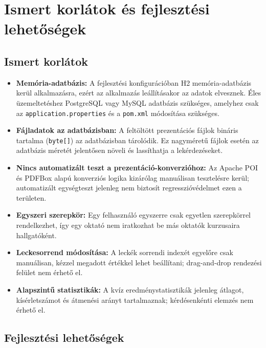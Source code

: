 \section{Ismert korlátok és fejlesztési lehetőségek}

\subsection{Ismert korlátok}

\begin{itemize}
    \item \textbf{Memória-adatbázis:} A fejlesztési konfigurációban H2 memória-adatbázis kerül alkalmazásra, ezért az alkalmazás leállításakor az adatok elvesznek. Éles üzemeltetéshez PostgreSQL vagy MySQL adatbázis szükséges, amelyhez csak az \texttt{application.properties} és a \texttt{pom.xml} módosítása szükséges.
    \item \textbf{Fájladatok az adatbázisban:} A feltöltött prezentációs fájlok bináris tartalma (\texttt{byte[]}) az adatbázisban tárolódik. Ez nagyméretű fájlok esetén az adatbázis méretét jelentősen növeli és lassíthatja a lekérdezéseket.
    \item \textbf{Nincs automatizált teszt a prezentáció-konverzióhoz:} Az Apache POI és PDFBox alapú konverziós logika kizárólag manuálisan tesztelésre kerül; automatizált egységteszt jelenleg nem biztosít regresszióvédelmet ezen a területen.
    \item \textbf{Egyszeri szerepkör:} Egy felhasználó egyszerre csak egyetlen szerepkörrel rendelkezhet, így egy oktató nem iratkozhat be más oktatók kurzusaira hallgatóként.
    \item \textbf{Leckesorrend módosítása:} A leckék sorrendi indexét egyelőre csak manuálisan, kézzel megadott értékkel lehet beállítani; drag-and-drop rendezési felület nem érhető el.
    \item \textbf{Alapszintű statisztikák:} A kvíz eredménystatisztikák jelenleg átlagot, kísérletszámot és átmenési arányt tartalmaznak; kérdésenkénti elemzés nem érhető el.
\end{itemize}

\subsection{Fejlesztési lehetőségek}

